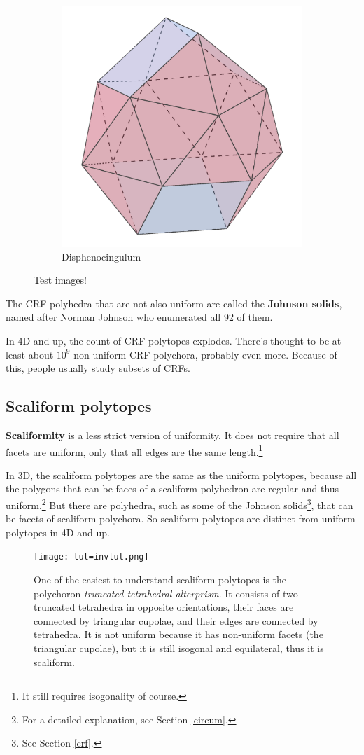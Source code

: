 \documentclass{article}
\begin{document}
\begin{figure}[h]
  \begin{subfigure}{.33333\textwidth}
    \centering
    \includegraphics[width=.5\linewidth]{Disphenocingulum}
    \caption{Disphenocingulum}
    \label{fig:polyhedra_3}
  \end{subfigure}%
  \caption{Test images!}
  \label{fig:crf_polyhedra}
\end{figure}

The CRF polyhedra that are not also uniform are called the \textbf{Johnson solids}, named after
Norman Johnson who enumerated all 92 of them.

In 4D and up, the count of CRF polytopes explodes. There's thought to be at least about $10^{9}$
non-uniform CRF polychora, probably even more. Because of this, people usually study subsets of CRFs.

\subsection{Scaliform polytopes}
\label{scaliform}

\textbf{Scaliformity} is a less strict version of uniformity. It does not require that
all facets are uniform, only that all edges are the same length.\footnote{
  It still requires isogonality of course.}

In 3D, the scaliform polytopes are the same as the uniform polytopes, because all the polygons
that can be faces of a scaliform polyhedron are regular and thus uniform.\footnote{
  For a detailed explanation, see Section \ref{circum}.} But there are
polyhedra, such as some of the Johnson solids\footnote{See Section \ref{crf}.}, that can be facets
of scaliform polychora. So scaliform polytopes are distinct from uniform polytopes in 4D and up.

\begin{figure}[H]
  \centering
  \texttt{[image: tut=invtut.png]}
  \caption{One of the easiest to understand scaliform polytopes is the polychoron
    \textit{truncated tetrahedral alterprism}. It consists of two truncated tetrahedra
    in opposite orientations, their faces are connected by triangular cupolae, and
    their edges are connected by tetrahedra. It is not uniform because it has non-uniform
    facets (the triangular cupolae), but it is still isogonal and equilateral, thus it is
    scaliform.}
\end{figure}
\end{document}
